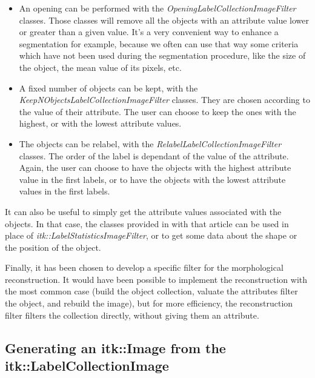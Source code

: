 \documentclass{InsightArticle}
\begin{document}
\begin{itemize}
  \item An opening can be performed with the {\em
OpeningLabelCollectionImageFilter} classes. Those classes will remove all the
objects with an attribute value lower or greater than a given value. It's a very
convenient way to enhance a segmentation for example, because we often can use
that way some criteria  which have not been used during the segmentation
procedure, like the size of the object, the mean value of its pixels, etc.
  \item A fixed number of objects can be kept, with the {\em
KeepNObjectsLabelCollectionImageFilter} classes. They are chosen according to
the value of their attribute. The user can choose to keep the ones with the
highest, or with the lowest attribute values.
  \item The objects can be relabel, with the {\em
RelabelLabelCollectionImageFilter} classes. The order of the label is dependant
of the value of the attribute. Again, the user can choose to have the objects
with the highest attribute value in the first labels, or to have the objects
with the lowest attribute values in the first labels.
\end{itemize}

It can also be useful to simply get the attribute values associated with the
objects. In that case, the classes provided in with that article can be used in
place of {\em itk::LabelStatisticsImageFilter}, or to get some data about the
shape or the position of the object.

Finally, it has been chosen to develop a specific filter for the morphological
reconstruction. It would have been possible to implement the reconstruction
with the most common case (build the object collection, valuate the attributes
filter the object, and rebuild the image), but for more efficiency, the reconstruction
filter filters the collection directly, without giving them an attribute.

\subsection{Generating an itk::Image from the itk::LabelCollectionImage}
\end{document}
